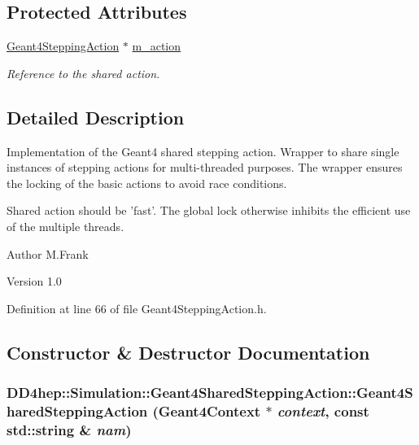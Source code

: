 \subsection*{Protected Attributes}
\begin{DoxyCompactItemize}
\item 
\hyperlink{class_d_d4hep_1_1_simulation_1_1_geant4_stepping_action}{Geant4SteppingAction} $\ast$ \hyperlink{class_d_d4hep_1_1_simulation_1_1_geant4_shared_stepping_action_a193a6e462877931a4423e15174aa5a7b}{m\_\-action}
\begin{DoxyCompactList}\small\item\em Reference to the shared action. \item\end{DoxyCompactList}\end{DoxyCompactItemize}


\subsection{Detailed Description}
Implementation of the Geant4 shared stepping action. Wrapper to share single instances of stepping actions for multi-\/threaded purposes. The wrapper ensures the locking of the basic actions to avoid race conditions.

Shared action should be 'fast'. The global lock otherwise inhibits the efficient use of the multiple threads.

\begin{DoxyAuthor}{Author}
M.Frank 
\end{DoxyAuthor}
\begin{DoxyVersion}{Version}
1.0 
\end{DoxyVersion}


Definition at line 66 of file Geant4SteppingAction.h.

\subsection{Constructor \& Destructor Documentation}
\hypertarget{class_d_d4hep_1_1_simulation_1_1_geant4_shared_stepping_action_a0b5677a3782b0762414d8b3fae4ab10f}{
\subsubsection[{Geant4SharedSteppingAction}]{\setlength{\rightskip}{0pt plus 5cm}DD4hep::Simulation::Geant4SharedSteppingAction::Geant4SharedSteppingAction ({\bf Geant4Context} $\ast$ {\em context}, \/  const std::string \& {\em nam})}}
\label{class_d_d4hep_1_1_simulation_1_1_geant4_shared_stepping_action_a0b5677a3782b0762414d8b3fae4ab10f}


